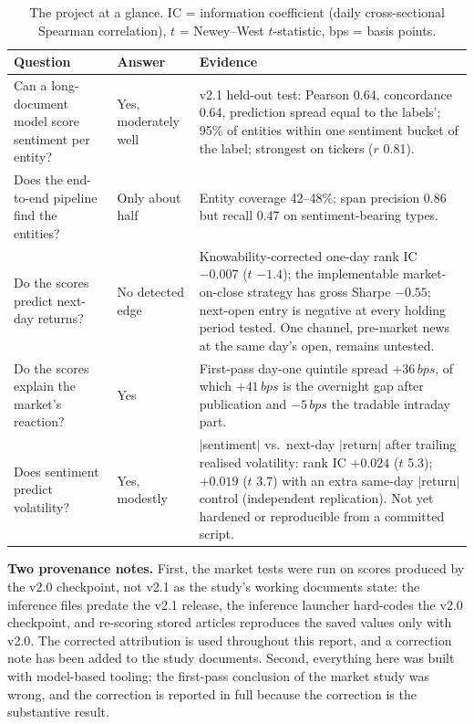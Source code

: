 \documentclass[11pt,letterpaper]{article}
\newcommand{\bps}{\,bps}
\begin{document}
\begin{table}[H]
\centering\small
\begin{tabularx}{\linewidth}{@{}P{4.1cm}P{2.6cm}Y@{}}
\toprule
\textbf{Question} & \textbf{Answer} & \textbf{Evidence} \\
\midrule
Can a long-document model score sentiment per entity? & Yes, moderately well &
  v2.1 held-out test: Pearson 0.64, concordance 0.64, prediction spread equal to the labels';
  95\% of entities within one sentiment bucket of the label; strongest on tickers ($r$ 0.81). \\
Does the end-to-end pipeline find the entities? & Only about half &
  Entity coverage 42--48\%; span precision 0.86 but recall 0.47 on sentiment-bearing types. \\
Do the scores predict next-day returns? & No detected edge &
  Knowability-corrected one-day rank IC $-0.007$ ($t$ $-1.4$); the implementable market-on-close
  strategy has gross Sharpe $-0.55$; next-open entry is negative at every holding period tested.
  One channel, pre-market news at the same day's open, remains untested. \\
Do the scores explain the market's reaction? & Yes &
  First-pass day-one quintile spread $+36\bps$, of which $+41\bps$ is the overnight gap after
  publication and $-5\bps$ the tradable intraday part. \\
Does sentiment predict volatility? & Yes, modestly &
  $|$sentiment$|$ vs.\ next-day $|$return$|$ after trailing realised volatility: rank IC $+0.024$
  ($t$ 5.3); $+0.019$ ($t$ 3.7) with an extra same-day $|$return$|$ control (independent
  replication). Not yet hardened or reproducible from a committed script. \\
\bottomrule
\end{tabularx}
\caption{The project at a glance. IC = information coefficient (daily cross-sectional Spearman
correlation), $t$ = Newey--West $t$-statistic, bps = basis points.}
\label{tab:glance}
\end{table}

\textbf{Two provenance notes.} First, the market tests were run on scores produced by the v2.0
checkpoint, not v2.1 as the study's working documents state: the inference files predate the v2.1
release, the inference launcher hard-codes the v2.0 checkpoint, and re-scoring stored articles
reproduces the saved values only with v2.0. The corrected attribution is used throughout this
report, and a correction note has been added to the study documents. Second, everything here was
built with model-based tooling; the first-pass conclusion of the market study was wrong, and the
correction is reported in full because the correction is the substantive result.
\end{document}

